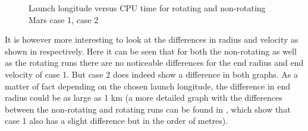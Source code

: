 \begin{figure}[H]
\centering
{} 
\caption{Launch longitude versus CPU time for rotating and non-rotating Mars \protect{} case 1,  \protect{} case 2 } 
\label{fig:launchLongitudeVsCPUcase1combined} 
\end{figure} 

\noindent
It is however more interesting to look at the differences in radius and velocity as shown in  respectively. Here it can be seen that for both the non-rotating as well as the rotating runs there are no noticeable differences for the end radius and end velocity of case 1. But case 2 does indeed show a difference in both graphs. As a matter of fact depending on the chosen launch longitude, the difference in end radius could be as large as 1 km (a more detailed graph with the differences between the non-rotating and rotating runs can be found in , which show that case 1 also has a slight difference but in the order of metres). 


